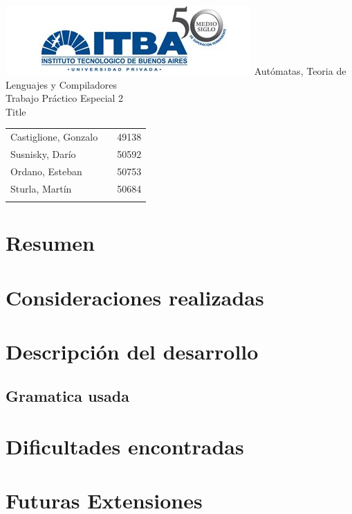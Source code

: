 \documentclass[a4paper,10pt]{article}
\begin{document}
\begin{titlepage}
	\thispagestyle{empty}
	\begin{center}
		\includegraphics[scale=0.7]{./images/itba.jpg}
		\vfill
		\Huge{Autómatas, Teoria de Lenguajes y Compiladores}\\
		\vspace{1cm}
		\huge{Trabajo Práctico Especial 2} \\
		\vspace{0.3cm}
		\huge{Title}
	\end{center}
	\vspace{2cm}
	\large{
		\begin{tabular}{lcr}
			Castiglione, Gonzalo & & 49138 \\
			Susnisky, Darío & & 50592 \\
			Ordano, Esteban & & 50753 \\
			Sturla, Martín & & 50684 \\
			\\ 
		\end{tabular}
	}
	\vfill
	\flushright{\today}
\end{titlepage}

\newpage


	\thispagestyle{empty}
\tableofcontents

\newpage

\setcounter{page}{1}

\newpage

\section{Resumen}
\newpage

\section{Consideraciones realizadas}

\newpage

\section{Descripción del desarrollo}
  
\subsection{Gramatica usada}

\newpage

\section{Dificultades encontradas}
\newpage

\section{Futuras Extensiones}
   
\end{document}
